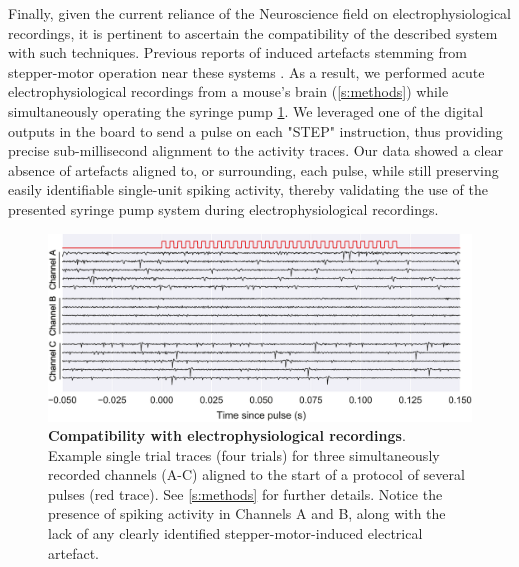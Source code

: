 Finally, given the current reliance of the Neuroscience field on electrophysiological recordings, it is pertinent to ascertain the compatibility of the described system with such techniques. Previous reports of induced artefacts stemming from stepper-motor operation near these systems \citep{Amarante2019}. As a result, we performed acute electrophysiological recordings from a mouse's brain (\ref{s:methods}) while simultaneously operating the syringe pump \ref{fig:Ephys}. 
We leveraged one of the digital outputs in the board to send a pulse on each "STEP" instruction, thus providing precise sub-millisecond alignment to the activity traces. 
Our data showed a clear absence of artefacts aligned to, or surrounding, each pulse, while still preserving easily identifiable single-unit spiking activity, thereby validating the use of the presented syringe pump system during electrophysiological recordings.

\begin{figure}[ht] 
	\centering
	\includegraphics[width=1.0\linewidth]{Figures/Artboard 7.pdf}
	\caption{\textbf{Compatibility with electrophysiological recordings}.\\
	Example single trial traces (four trials) for three simultaneously recorded channels (A-C) aligned to the start of a protocol of several pulses (red trace). See \ref{s:methods} for further details. Notice the presence of spiking activity in Channels A and B, along with the lack of any clearly identified stepper-motor-induced electrical artefact.}	
	\label{fig:Ephys}
\end{figure}





